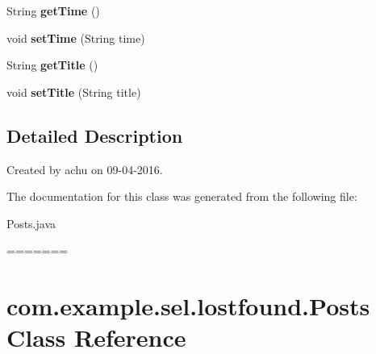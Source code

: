 \begin{DoxyCompactItemize}
\item 
\hypertarget{classcom_1_1example_1_1sel_1_1lostfound_1_1Posts_a0872388ed7ec381a86f048bf6a5bf5c9}{String {\bfseries get\-Time} ()}\label{classcom_1_1example_1_1sel_1_1lostfound_1_1Posts_a0872388ed7ec381a86f048bf6a5bf5c9}

\item 
\hypertarget{classcom_1_1example_1_1sel_1_1lostfound_1_1Posts_ab61e2cf2af2faf0b07bb46165befb3d0}{void {\bfseries set\-Time} (String time)}\label{classcom_1_1example_1_1sel_1_1lostfound_1_1Posts_ab61e2cf2af2faf0b07bb46165befb3d0}

\item 
\hypertarget{classcom_1_1example_1_1sel_1_1lostfound_1_1Posts_aa16203c629985858be8b80f1ed720c24}{String {\bfseries get\-Title} ()}\label{classcom_1_1example_1_1sel_1_1lostfound_1_1Posts_aa16203c629985858be8b80f1ed720c24}

\item 
\hypertarget{classcom_1_1example_1_1sel_1_1lostfound_1_1Posts_a5028297b56d5feb7d6f2b0a0fbc859ad}{void {\bfseries set\-Title} (String title)}\label{classcom_1_1example_1_1sel_1_1lostfound_1_1Posts_a5028297b56d5feb7d6f2b0a0fbc859ad}

\end{DoxyCompactItemize}


\subsection{Detailed Description}
Created by achu on 09-\/04-\/2016. 

The documentation for this class was generated from the following file\-:\begin{DoxyCompactItemize}
\item 
Posts.\-java\end{DoxyCompactItemize}
=======
\hypertarget{classcom_1_1example_1_1sel_1_1lostfound_1_1Posts}{\section{com.\-example.\-sel.\-lostfound.\-Posts \-Class \-Reference}
\label{classcom_1_1example_1_1sel_1_1lostfound_1_1Posts}
}
